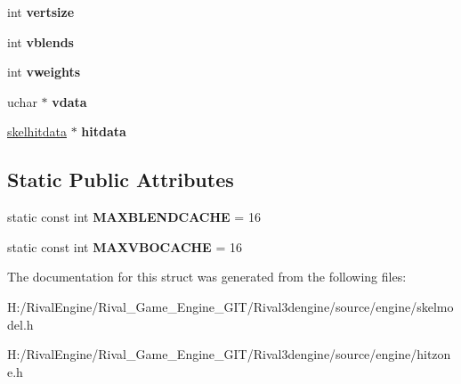 \begin{DoxyCompactItemize}
int {\bfseries vertsize}
\item 
\mbox{\label{structskelmodel_1_1skelmeshgroup_adb0f6dc25023c966cf7f75c52c015518}} 
int {\bfseries vblends}
\item 
\mbox{\label{structskelmodel_1_1skelmeshgroup_a65b79f720aeca283b83984e1fe2a520f}} 
int {\bfseries vweights}
\item 
\mbox{\label{structskelmodel_1_1skelmeshgroup_a08bdbaf064a06d8e080ddb37f57e01d8}} 
uchar $\ast$ {\bfseries vdata}
\item 
\mbox{\label{structskelmodel_1_1skelmeshgroup_a317cf773f770c977a7d0be57a7f526ff}} 
\hyperlink{structskelhitdata}{skelhitdata} $\ast$ {\bfseries hitdata}
\end{DoxyCompactItemize}
\subsection*{Static Public Attributes}
\begin{DoxyCompactItemize}
\item 
\mbox{\label{structskelmodel_1_1skelmeshgroup_a4abd5fdb404a0d623af1744db29d009c}} 
static const int {\bfseries M\+A\+X\+B\+L\+E\+N\+D\+C\+A\+C\+HE} = 16
\item 
\mbox{\label{structskelmodel_1_1skelmeshgroup_a9c16679c989abb7c3e685b643719d1fa}} 
static const int {\bfseries M\+A\+X\+V\+B\+O\+C\+A\+C\+HE} = 16
\end{DoxyCompactItemize}


The documentation for this struct was generated from the following files\+:\begin{DoxyCompactItemize}
\item 
H\+:/\+Rival\+Engine/\+Rival\+\_\+\+Game\+\_\+\+Engine\+\_\+\+G\+I\+T/\+Rival3dengine/source/engine/skelmodel.\+h\item 
H\+:/\+Rival\+Engine/\+Rival\+\_\+\+Game\+\_\+\+Engine\+\_\+\+G\+I\+T/\+Rival3dengine/source/engine/hitzone.\+h\end{DoxyCompactItemize}
